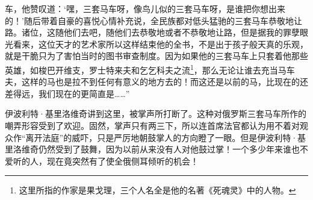 车，他赞叹道：‘嘿，三套马车呀，像鸟儿似的三套马车呀，是谁把你想出来的！’随后带着自豪的喜悦心情补充说，全民族都对低头猛驰的三套马车恭敬地让路。诸位，这随他们去吧，随他们去恭敬地或者不恭敬地让路，但是据我的罪孽眼光看来，这位天才的艺术家所以这样结束他的全书，不是出于孩子般天真的乐观，就是干脆只为了害怕当时的图书审查制度。因为如果他的三套马车上只套着他那些英雄，如梭巴开维支，罗士特来夫和乞乞科夫之流\footnote{这里所指的作家是果戈理，三个人名全是他的名著《死魂灵》中的人物。}，那么无论让谁去充当马车夫，这样的马也是拉不到任何有意义的地方去的！而这还是以前的马，比现在的还差得远，我们现在的更简直是……”
\par 伊波利特·基里洛维奇讲到这里，被掌声所打断了。这种对俄罗斯三套马车所作的嘲弄形容受到了欢迎。固然，掌声只有两三下，所以连首席法官都认为用不着对观众作“离开法庭”的威吓，只是严厉地朝鼓掌人的方向瞪了一眼。但是伊波利特·基里洛维奇仍然受到了鼓舞，因为以前从来没有人对他鼓过掌！一个多少年来谁也不爱听的人，现在竟突然有了使全俄侧耳倾听的机会！
